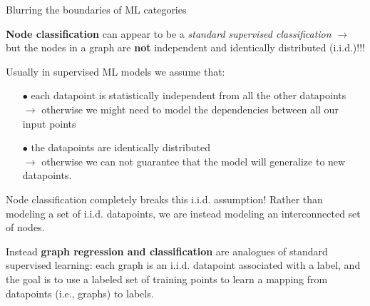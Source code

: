 \documentclass[10pt, aspectratio=169, compress, protectframetitle, handout]{beamer}
\begin{document}
\begin{frame}{Blurring the boundaries of ML categories}

    \textbf{Node classification} can appear to be a \emph{standard supervised classification} $\longrightarrow$ but the nodes in a graph are \alert{\textbf{not} independent and identically distributed (i.i.d.)!!!}
    
    Usually in supervised ML models we assume that:
    \begin{itemize}
        \item[\alert{$\bullet$}] each datapoint is statistically independent from all the other datapoints\\
        $\rightarrow$ otherwise we might need to model the dependencies between all our input points
        \item[\alert{$\bullet$}] the datapoints are identically distributed\\
        $\rightarrow$ otherwise we can not guarantee that the model will generalize to new datapoints.
    \end{itemize}
    
    \alert{Node classification completely breaks this i.i.d. assumption!} Rather than modeling a set of i.i.d. datapoints, we are instead modeling an interconnected set of nodes.
    
    Instead \textbf{graph regression and classification} are analogues of standard supervised learning: each graph is an i.i.d. datapoint associated with a label, and the goal is to use a labeled set of training points to learn a mapping from datapoints (i.e., graphs) to labels.
    
\end{frame}




    
\end{document}
